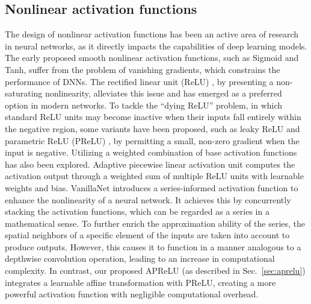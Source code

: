 \documentclass[journal]{IEEEtran}
\newcommand{\rev}[1]{#1}
\begin{document}
\subsection{Nonlinear activation functions}
The design of nonlinear activation functions has been an active area of research in neural networks, as it directly impacts the capabilities of deep learning models. The early proposed smooth nonlinear activation functions, such as Sigmoid and Tanh, suffer from the problem of vanishing gradients, which constrains the performance of DNNs. The rectified linear unit (ReLU) \cite{ReLU}, by presenting a non-saturating nonlinearity, alleviates this issue and has emerged as a preferred option in modern networks. To tackle the ``dying ReLU'' problem, \rev{in which standard ReLU units may become inactive when their inputs fall entirely within the negative region}, some variants have been proposed, such as leaky ReLU \cite{LeakyReLU} and parametric ReLU (PReLU) \cite{PReLU}, by permitting a small, non-zero gradient when the input is negative. Utilizing a weighted combination of base activation functions has also been explored. Adaptive piecewise linear activation unit \cite{APL_act} computes the activation output through a weighted sum of multiple ReLU units with learnable weights and bias. VanillaNet \cite{Vanillanet} introduces a series-informed activation function to enhance the nonlinearity of a neural network. It achieves this by concurrently stacking the activation functions, which can be regarded as a series in a mathematical sense. To further enrich the approximation ability of the series, the spatial neighbors of a specific element of the inputs are taken into account to produce outputs. However, this causes it to function in a manner analogous to a depthwise convolution operation, leading to an increase in computational complexity. In contrast, our proposed APReLU (as described in Sec.~\ref{sec:aprelu}) integrates a learnable affine transformation with PReLU, creating a more powerful activation function with negligible computational overhead.
\end{document}
